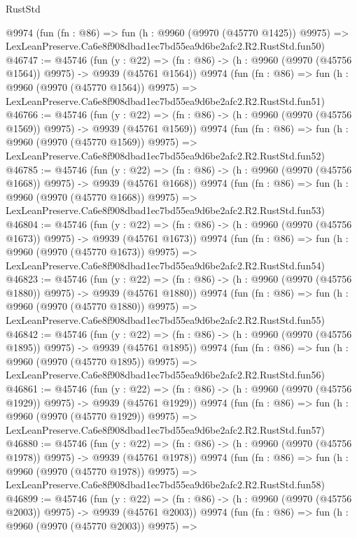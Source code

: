 \begin{lexlean}{RustStd}
\begin{coremodule}
    @9974
    (fun (fn : @86) =>
    fun (h : @9960 (@9970 (@45770 @1425)) @9975) =>
    LexLeanPreserve.Ca6e8f908dbad1ec7bd55ea9d6be2afc2.R2.RustStd.fun50)
@46747 := @45746
    (fun (y : @22) =>
    (fn : @86) -> (h : @9960 (@9970 (@45756 @1564)) @9975) -> @9939 (@45761 @1564))
    @9974
    (fun (fn : @86) =>
    fun (h : @9960 (@9970 (@45770 @1564)) @9975) =>
    LexLeanPreserve.Ca6e8f908dbad1ec7bd55ea9d6be2afc2.R2.RustStd.fun51)
@46766 := @45746
    (fun (y : @22) =>
    (fn : @86) -> (h : @9960 (@9970 (@45756 @1569)) @9975) -> @9939 (@45761 @1569))
    @9974
    (fun (fn : @86) =>
    fun (h : @9960 (@9970 (@45770 @1569)) @9975) =>
    LexLeanPreserve.Ca6e8f908dbad1ec7bd55ea9d6be2afc2.R2.RustStd.fun52)
@46785 := @45746
    (fun (y : @22) =>
    (fn : @86) -> (h : @9960 (@9970 (@45756 @1668)) @9975) -> @9939 (@45761 @1668))
    @9974
    (fun (fn : @86) =>
    fun (h : @9960 (@9970 (@45770 @1668)) @9975) =>
    LexLeanPreserve.Ca6e8f908dbad1ec7bd55ea9d6be2afc2.R2.RustStd.fun53)
@46804 := @45746
    (fun (y : @22) =>
    (fn : @86) -> (h : @9960 (@9970 (@45756 @1673)) @9975) -> @9939 (@45761 @1673))
    @9974
    (fun (fn : @86) =>
    fun (h : @9960 (@9970 (@45770 @1673)) @9975) =>
    LexLeanPreserve.Ca6e8f908dbad1ec7bd55ea9d6be2afc2.R2.RustStd.fun54)
@46823 := @45746
    (fun (y : @22) =>
    (fn : @86) -> (h : @9960 (@9970 (@45756 @1880)) @9975) -> @9939 (@45761 @1880))
    @9974
    (fun (fn : @86) =>
    fun (h : @9960 (@9970 (@45770 @1880)) @9975) =>
    LexLeanPreserve.Ca6e8f908dbad1ec7bd55ea9d6be2afc2.R2.RustStd.fun55)
@46842 := @45746
    (fun (y : @22) =>
    (fn : @86) -> (h : @9960 (@9970 (@45756 @1895)) @9975) -> @9939 (@45761 @1895))
    @9974
    (fun (fn : @86) =>
    fun (h : @9960 (@9970 (@45770 @1895)) @9975) =>
    LexLeanPreserve.Ca6e8f908dbad1ec7bd55ea9d6be2afc2.R2.RustStd.fun56)
@46861 := @45746
    (fun (y : @22) =>
    (fn : @86) -> (h : @9960 (@9970 (@45756 @1929)) @9975) -> @9939 (@45761 @1929))
    @9974
    (fun (fn : @86) =>
    fun (h : @9960 (@9970 (@45770 @1929)) @9975) =>
    LexLeanPreserve.Ca6e8f908dbad1ec7bd55ea9d6be2afc2.R2.RustStd.fun57)
@46880 := @45746
    (fun (y : @22) =>
    (fn : @86) -> (h : @9960 (@9970 (@45756 @1978)) @9975) -> @9939 (@45761 @1978))
    @9974
    (fun (fn : @86) =>
    fun (h : @9960 (@9970 (@45770 @1978)) @9975) =>
    LexLeanPreserve.Ca6e8f908dbad1ec7bd55ea9d6be2afc2.R2.RustStd.fun58)
@46899 := @45746
    (fun (y : @22) =>
    (fn : @86) -> (h : @9960 (@9970 (@45756 @2003)) @9975) -> @9939 (@45761 @2003))
    @9974
    (fun (fn : @86) =>
    fun (h : @9960 (@9970 (@45770 @2003)) @9975) =>

\end{coremodule}
\end{lexlean}
